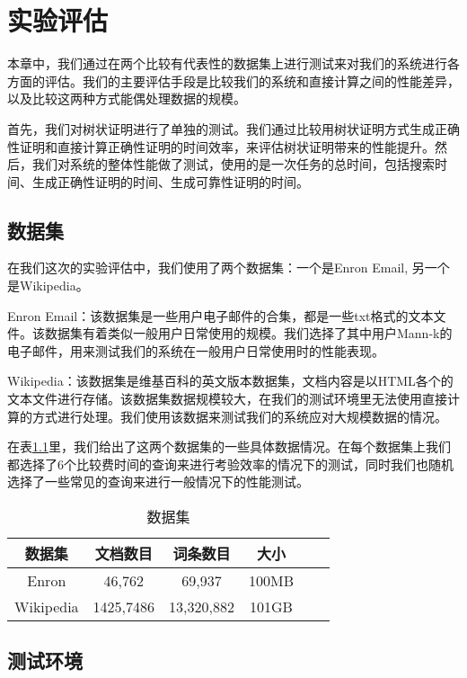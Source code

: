 \chapter{实验评估}
\label{chap:evaluation}
本章中，我们通过在两个比较有代表性的数据集上进行测试来对我们的系统进行各方面的评估。我们的主要评估手段是比较我们的系统和直接计算之间的性能差异，以及比较这两种方式能偶处理数据的规模。

首先，我们对树状证明进行了单独的测试。我们通过比较用树状证明方式生成正确性证明和直接计算正确性证明的时间效率，来评估树状证明带来的性能提升。然后，我们对系统的整体性能做了测试，使用的是一次任务的总时间，包括搜索时间、生成正确性证明的时间、生成可靠性证明的时间。

\section{数据集}

在我们这次的实验评估中，我们使用了两个数据集：一个是Enron Email, 另一个是Wikipedia。

Enron Email：该数据集是一些用户电子邮件的合集，都是一些txt格式的文本文件。该数据集有着类似一般用户日常使用的规模。我们选择了其中用户Mann-k的电子邮件，用来测试我们的系统在一般用户日常使用时的性能表现。

Wikipedia：该数据集是维基百科的英文版本数据集，文档内容是以HTML各个的文本文件进行存储。该数据集数据规模较大，在我们的测试环境里无法使用直接计算的方式进行处理。我们使用该数据来测试我们的系统应对大规模数据的情况。

在表\ref{tab:dataset_stat}里，我们给出了这两个数据集的一些具体数据情况。在每个数据集上我们都选择了6个比较费时间的查询来进行考验效率的情况下的测试，同时我们也随机选择了一些常见的查询来进行一般情况下的性能测试。
\begin{table}[htb]
    \centering
    \caption{数据集}
    \begin{tabular}{cccccc}
        \toprule
        数据集 & 文档数目 & 词条数目 & 大小 \\
        \midrule
        Enron & 46,762 & 69,937 & 100MB  \\
        Wikipedia & 1425,7486 & 13,320,882 & 101GB  \\
        \bottomrule
    \end{tabular}
    \label{tab:dataset_stat}
\end{table}

\section {测试环境}

